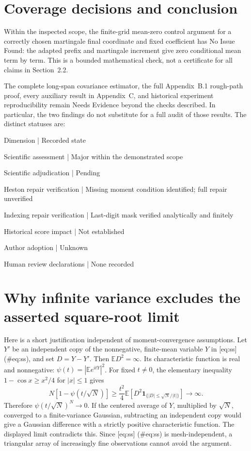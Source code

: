 \documentclass[10pt]{article}
\begin{document}
\section*{Coverage decisions and conclusion}
Within the inspected scope, the finite-grid mean-zero control argument for a correctly chosen martingale final coordinate and fixed coefficient has No Issue Found: the adapted prefix and martingale increment give zero conditional mean term by term. This is a bounded mathematical check, not a certificate for all claims in Section 2.2.\par
The complete long-span covariance estimator, the full Appendix B.1 rough-path proof, every auxiliary result in Appendix C, and historical experiment reproducibility remain Needs Evidence beyond the checks described. In particular, the two findings do not substitute for a full audit of those results. The distinct statuses are:\par
Dimension | Recorded state\par
Scientific assessment | Major within the demonstrated scope\par
Scientific adjudication | Pending\par
Heston repair verification | Missing moment condition identified; full repair unverified\par
Indexing repair verification | Last-digit mask verified analytically and finitely\par
Historical score impact | Not established\par
Author adoption | Unknown\par
Human review declarations | None recorded\par
\section*{Why infinite variance excludes the asserted square-root limit}
Here is a short justification independent of moment-convergence assumptions. Let \(Y'\) be an independent copy of the nonnegative, finite-mean variable \(Y\) in [eq:ss] (\#eq:ss), and set \(D=Y-Y'\). Then \(\mathbb ED^2=\infty\). Its characteristic function is real and nonnegative: \(\psi(t)=|\mathbb Ee^{itY}|^2\). For fixed \(t\ne0\), the elementary inequality \(1-\cos x\ge x^2/4\) for \(|x|\le1\) gives \[N[1-\psi(t/\sqrt N)]
 \ge\frac{t^2}{4}
      \mathbb E\!\left[D^2\mathbf1_{\{|D|\le\sqrt N/|t|\}}\right]
 \longrightarrow\infty.\] Therefore \(\psi(t/\sqrt N)^N\to 0\). If the centered average of \(Y\), multiplied by \(\sqrt N\), converged to a finite-variance Gaussian, subtracting an independent copy would give a Gaussian difference with a strictly positive characteristic function. The displayed limit contradicts this. Since [eq:ss] (\#eq:ss) is mesh-independent, a triangular array of increasingly fine observations cannot avoid the argument.\par
\end{document}
